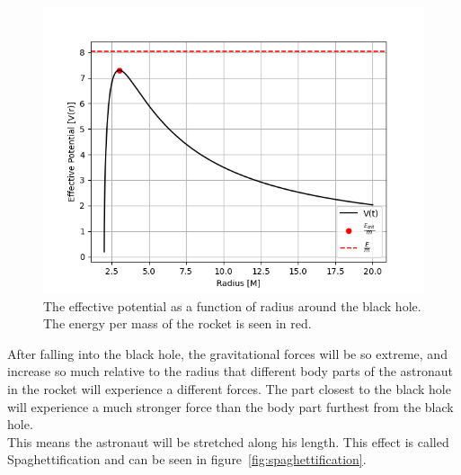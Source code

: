 \documentclass[reprint,english,notitlepage]{revtex4-2}
\begin{document}
        \begin{figure}[h]
            \centering
            \includegraphics[scale=0.4]{ex6_effpotential}
            \caption{The effective potential as a function of radius around the black hole. The energy per mass of the rocket is seen in red.}\label{fig:eff_potential}
        \end{figure}

        After falling into the black hole, the gravitational forces will be so extreme, and increase so much relative to the radius that different body parts of the astronaut in the rocket will experience a different forces.
        The part closest to the black hole will experience a much stronger force than the body part furthest from the black hole.\\
        This means the astronaut will be stretched along his length.
        This effect is called Spaghettification and can be seen in figure~\ref{fig:spaghettification}.
\end{document}
